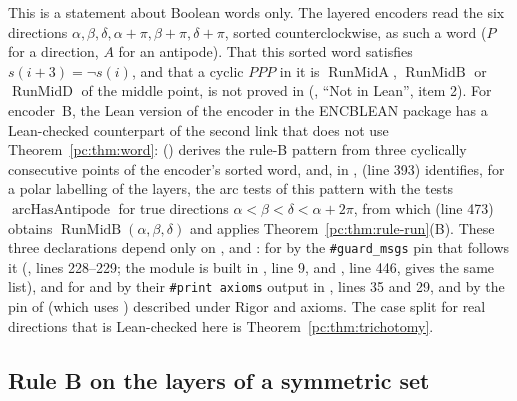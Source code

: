 \begin{remark}\label{pc:rem:word-scope}
This is a statement about Boolean words only. The layered encoders read the six directions $\alpha,\beta,\delta,
\alpha+\pi,\beta+\pi,\delta+\pi$, sorted counterclockwise, as such a word ($P$ for a direction, $A$ for an
antipode). That this sorted word satisfies $s(i+3)=\neg s(i)$, and that a cyclic $PPP$ in it is
$\operatorname{RunMidA}$, $\operatorname{RunMidB}$ or $\operatorname{RunMidD}$ of the middle point, is not proved in
 (, ``Not in Lean'', item 2). For encoder~B, the Lean version of the
encoder in the ENCBLEAN package has a Lean-checked counterpart of the second link that does not use
Theorem~\ref{pc:thm:word}:  () derives the rule-B
pattern  from three cyclically consecutive points of the encoder's sorted word, and, in
,  (line 393) identifies, for a polar labelling
of the layers, the arc tests of this pattern with the tests $\operatorname{arcHasAntipode}$ for true directions
$\alpha<\beta<\delta<\alpha+2\pi$, from which  (line 473) obtains
$\operatorname{RunMidB}(\alpha,\beta,\delta)$ and applies Theorem~\ref{pc:thm:rule-run}(B). These three
declarations depend only on ,  and : for  by
the \texttt{\#guard\_msgs} pin that follows it (, lines 228--229; the module is
built in , line 9, and , line 446, gives the same
list), and for  and  by their \texttt{\#print axioms} output in
, lines 35 and 29, and by the pin of  (which
uses ) described under Rigor and axioms. The case split for real directions that is
Lean-checked here is Theorem~\ref{pc:thm:trichotomy}.
\end{remark}

\subsection{Rule B on the layers of a symmetric set}\label{pc:sub:layers}

